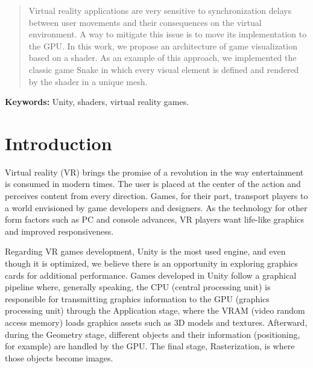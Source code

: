 \documentclass[12pt]{article}
\title{}
\author{Adriano M. Gil\inst{1}, Thiago S. Figueira\inst{1}}
\begin{document}
\maketitle

\begin{abstract}
    Virtual reality applications are very sensitive to synchronization delays between user movements and their consequences on the virtual environment. A way to mitigate this issue is to move its implementation to the GPU. In this work, we propose an architecture of game visualization based on a shader. As an example of this approach, we implemented the classic game Snake in which every visual element is defined and rendered by the shader in a unique mesh.
\end{abstract}

\smallskip

\noindent \textbf{Keywords:} Unity, shaders, virtual reality games.

\section{Introduction} 
Virtual reality (VR) brings the promise of a revolution in the way entertainment is consumed in modern times. The user is placed at the center of the action and perceives content from every direction. Games, for their part,  transport players to a world envisioned by game developers and designers. As the technology for other form factors such as PC and console advances, VR players want life-like graphics and improved responsiveness. 

Regarding VR games development, Unity is the most used engine, and even though it is optimized, we believe there is an opportunity in exploring graphics cards for additional performance. Games developed in Unity follow a graphical pipeline where, generally speaking, the CPU (central processing unit) is responsible for transmitting graphics information to the GPU (graphics processing unit) through the Application stage, where the VRAM (video random access memory) loads graphics assets such as 3D models and textures. Afterward, during the Geometry stage, different objects and their information (positioning, for example) are handled by the GPU. The final stage, Rasterization, is where those objects become images.
\end{document}

